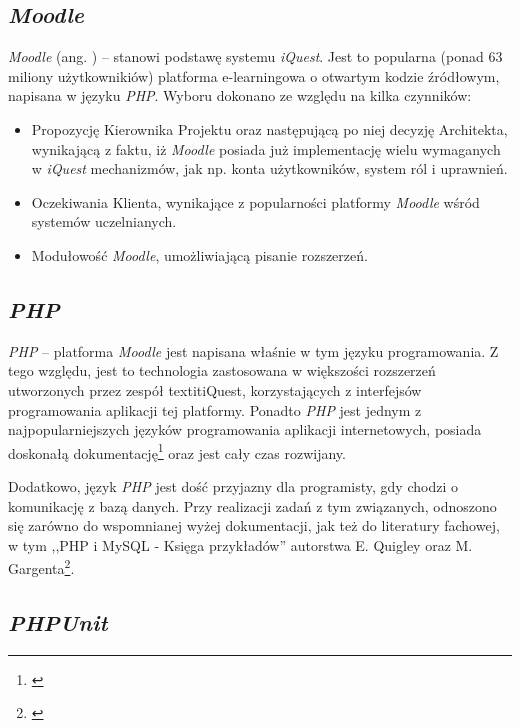 \subsection{\textit{Moodle}}
\label{Chapter631}

\textit{Moodle} (ang. ) -- stanowi podstawę systemu \textit{iQuest}. Jest to popularna (ponad 63 miliony użytkownikiów) platforma e-learningowa o otwartym kodzie źródłowym, napisana w języku \emph{PHP}. Wyboru dokonano ze względu na kilka czynników:
\begin{itemize}
\item{Propozycję Kierownika Projektu oraz następującą po niej decyzję Architekta, wynikającą z faktu, iż \textit{Moodle} posiada już implementację wielu wymaganych w \textit{iQuest} mechanizmów, jak np. konta użytkowników, system ról i uprawnień.}
\item{Oczekiwania Klienta, wynikające z popularności platformy \textit{Moodle} wśród systemów uczelnianych.}
\item{Modułowość \textit{Moodle}, umożliwiającą pisanie rozszerzeń.}
\end{itemize}

\subsection{\textit{PHP}}
\label{Chapter632}

\textit{PHP} -- platforma \textit{Moodle} jest napisana właśnie w tym języku programowania. Z tego względu, jest to technologia zastosowana w większości rozszerzeń utworzonych przez zespół textit{iQuest}, korzystających z interfejsów programowania aplikacji tej platformy. Ponadto \textit{PHP} jest jednym z najpopularniejszych języków programowania aplikacji internetowych, posiada doskonałą dokumentację\footnote{\cite{Man:PHP}} oraz jest cały czas rozwijany.

Dodatkowo, język \textit{PHP} jest dość przyjazny dla programisty, gdy chodzi o komunikację z bazą danych. Przy realizacji zadań z tym związanych, odnoszono się zarówno do wspomnianej wyżej dokumentacji, jak też do literatury fachowej, w tym ,,PHP i MySQL - Księga przykładów'' autorstwa E. Quigley oraz M. Gargenta\footnote{\cite{EQMG:PiMKp07}}.

\subsection{\textit{PHPUnit}}
\label{Chapter633}


